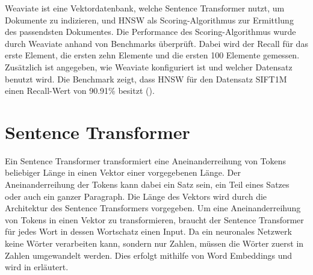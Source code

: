 
Weaviate ist eine Vektordatenbank, welche Sentence Transformer nutzt, um Dokumente zu indizieren, und HNSW als Scoring-Algorithmus zur Ermittlung des passendsten Dokumentes.
Die Performance des Scoring-Algorithmus wurde durch Weaviate anhand von Benchmarks überprüft.
Dabei wird der Recall für das erste Element, die ersten zehn Elemente und die ersten 100 Elemente gemessen.
Zusätzlich ist angegeben, wie Weaviate konfiguriert ist und welcher Datensatz benutzt wird.
Die Benchmark zeigt, dass HNSW für den Datensatz SIFT1M einen Recall-Wert von 90.91\% besitzt (\cite{Weaviate_Benchmark}).

\section{Sentence Transformer}
\label{chap:sentence-transformer}

Ein Sentence Transformer transformiert eine Aneinanderreihung von Tokens beliebiger Länge in einen Vektor einer vorgegebenen Länge.
Der Aneinanderreihung der Tokens kann dabei ein Satz sein, ein Teil eines Satzes oder auch ein ganzer Paragraph.
Die Länge des Vektors wird durch die Architektur des Sentence Transformers vorgegeben.
Um eine Aneinanderreihung von Tokens in einen Vektor zu transformieren, braucht der Sentence Transformer für jedes Wort in dessen Wortschatz einen Input.
Da ein neuronales Netzwerk keine Wörter verarbeiten kann, sondern nur Zahlen, müssen die Wörter zuerst in Zahlen umgewandelt werden.
Dies erfolgt mithilfe von Word Embeddings und wird in  erläutert.\\

